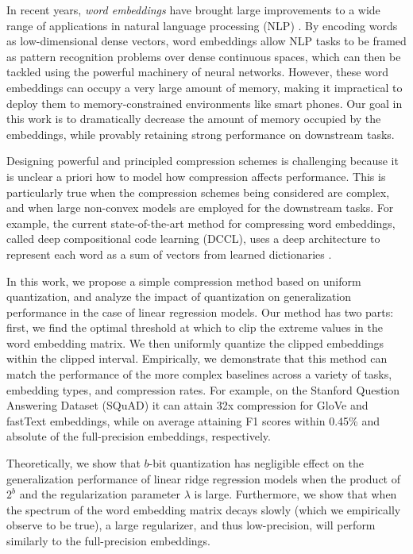 In recent years, \textit{word embeddings} \citep{word2vec13,glove14,fasttext18} have brought large improvements to a wide range of applications in natural language processing (NLP) \citep{collins16,drqa17}.
By encoding words as low-dimensional dense vectors, word embeddings allow NLP tasks to be framed as pattern recognition problems over dense continuous spaces, which can then be tackled using the powerful machinery of neural networks.
However, these word embeddings can occupy a very large amount of memory, making it impractical to deploy them to memory-constrained environments like smart phones.
Our goal in this work is to dramatically decrease the amount of memory occupied by the embeddings, while provably retaining strong performance on downstream tasks.

Designing powerful and principled compression schemes is challenging because it is unclear a priori how to model how compression affects performance.
This is particularly true when the compression schemes being considered are complex, and when large non-convex models are employed for the downstream tasks.
For example, the current state-of-the-art method for compressing word embeddings, called deep compositional code learning (DCCL), uses a deep architecture to represent each word as a sum of vectors from learned dictionaries \citep{dccl17}.

In this work, we propose a simple compression method based on uniform quantization, and analyze the impact of quantization on generalization performance in the case of linear regression models.
Our method has two parts: first, we find the optimal threshold at which to clip the extreme values in the word embedding matrix.  We then uniformly quantize the clipped embeddings within the clipped interval.
Empirically, we demonstrate that this method can match the performance of the more complex baselines across a variety of tasks, embedding types, and compression rates.
For example, on the Stanford Question Answering Dataset (SQuAD) \citep{squad16} it can attain 32x compression for GloVe and fastText embeddings, while on average attaining F1 scores within 0.45\% and  absolute of the full-precision embeddings, respectively.

Theoretically, we show that $b$-bit quantization has negligible effect on the generalization performance of linear ridge regression models when the product of $2^b$ and the regularization parameter $\lambda$ is large.
Furthermore, we show that when the spectrum of the word embedding matrix decays slowly (which we empirically observe to be true), a large regularizer, and thus low-precision, will perform similarly to the full-precision embeddings. 

